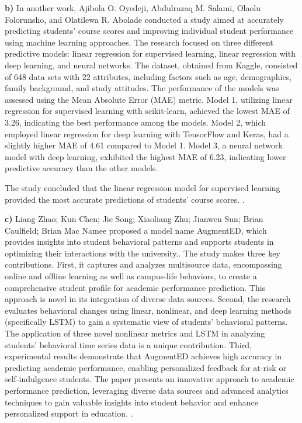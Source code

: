 \documentclass[conference]{IEEEtran}
\begin{document}
\textbf{b)} In another work, Ajibola O. Oyedeji, Abdulrazaq M. Salami, Olaolu Folorunsho, and Olatilewa R. Abolade conducted a study aimed at accurately predicting students' course scores and improving individual student performance using machine learning approaches. The research focused on three different predictive models: linear regression for supervised learning, linear regression with deep learning, and neural networks. The dataset, obtained from Kaggle, consisted of 648 data sets with 22 attributes, including factors such as age, demographics, family background, and study attitudes. The performance of the models was assessed using the Mean Absolute Error (MAE) metric. Model 1, utilizing linear regression for supervised learning with scikit-learn, achieved the lowest MAE of 3.26, indicating the best performance among the models. Model 2, which employed linear regression for deep learning with TensorFlow and Keras, had a slightly higher MAE of 4.61 compared to Model 1. Model 3, a neural network model with deep learning, exhibited the highest MAE of 6.23, indicating lower predictive accuracy than the other models.\par
The study concluded that the linear regression model for supervised learning provided the most accurate predictions of students' course scores. \cite{r5}.
\vspace{3mm}

\textbf{c)} Liang Zhao; Kun Chen; Jie Song; Xiaoliang Zhu; Jianwen Sun; Brian Caulfield; Brian Mac Namee proposed  a model name AugmentED, which provides insights into student behavioral patterns and supports students in optimizing their interactions with the university.. The study makes three key contributions. First, it captures and analyzes multisource data, encompassing online and offline learning as well as campus-life behaviors, to create a comprehensive student profile for academic performance prediction. This approach is novel in its integration of diverse data sources. Second, the research evaluates behavioral changes using linear, nonlinear, and deep learning methods (specifically LSTM) to gain a systematic view of students' behavioral patterns. The application of three novel nonlinear metrics and LSTM in analyzing students' behavioral time series data is a unique contribution. Third, experimental results demonstrate that AugmentED achieves high accuracy in predicting academic performance, enabling personalized feedback for at-risk or self-indulgence students. The paper presents an innovative approach to academic performance prediction, leveraging diverse data sources and advanced analytics techniques to gain valuable insights into student behavior and enhance personalized support in education. \cite{r6}.  
\vspace{3mm}
\end{document}
